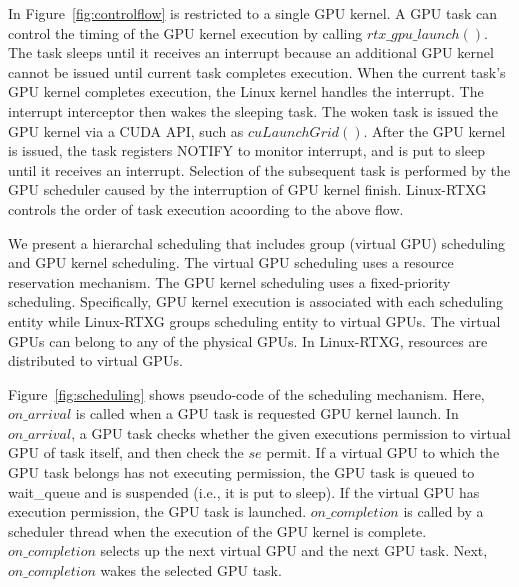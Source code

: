 In Figure~\ref{fig:controlflow} is restricted to a single GPU kernel.
A GPU task can control the timing of the GPU kernel execution by calling $rtx\_gpu\_launch()$.
The task sleeps until it receives an interrupt because an additional GPU kernel cannot be issued until current task completes execution.
When the current task’s GPU kernel completes execution, the Linux kernel handles the interrupt.
The interrupt interceptor then wakes the sleeping task.
The woken task is issued the GPU kernel via a CUDA API, such as $cuLaunchGrid()$.
After the GPU kernel is issued, the task registers NOTIFY to monitor interrupt,
and is put to sleep until it receives an interrupt.
Selection of the subsequent task is performed by the GPU scheduler caused by the interruption of GPU kernel finish.
Linux-RTXG controls the order of task execution acoording to the above flow.

We present a hierarchal scheduling that includes group (virtual GPU) scheduling and GPU kernel scheduling.
The virtual GPU scheduling uses a resource reservation mechanism.
The GPU kernel scheduling uses a fixed-priority scheduling.
Specifically, GPU kernel execution is associated with each scheduling entity while Linux-RTXG groups scheduling entity to virtual GPUs.
The virtual GPUs can belong to any of the physical GPUs.
In Linux-RTXG, resources are distributed to virtual GPUs.

Figure~\ref{fig:scheduling} shows pseudo-code of the scheduling mechanism.
Here, $on\_arrival$ is called when a GPU task is requested GPU kernel launch.
In $on\_arrival$, a GPU task checks whether the given executions permission to virtual GPU of task itself, and then check the $se$ permit.
If a virtual GPU to which the GPU task belongs has not executing permission, the GPU task is queued to wait\_queue and is suspended (i.e., it is put to sleep).
If the virtual GPU has execution permission, the GPU task is launched.
$on\_completion$ is called by a scheduler thread when the execution of the GPU kernel is complete.
$on\_completion$ selects up the next virtual GPU and the next GPU task.
Next, $on\_completion$ wakes the selected GPU task.

